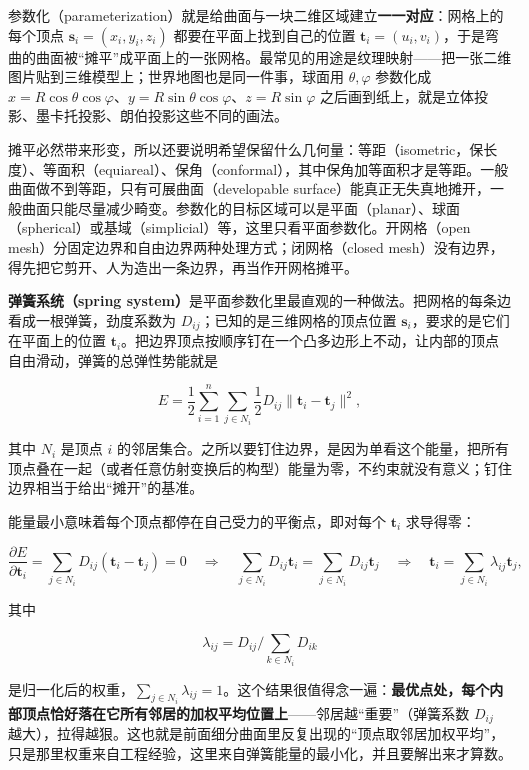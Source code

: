 参数化（parameterization）就是给曲面与一块二维区域建立\textbf{一一对应}：网格上的每个顶点 $\mathbf{s}_i = (x_i, y_i, z_i)$ 都要在平面上找到自己的位置 $\mathbf{t}_i = (u_i, v_i)$，于是弯曲的曲面被“摊平”成平面上的一张网格。最常见的用途是纹理映射——把一张二维图片贴到三维模型上；世界地图也是同一件事，球面用 $\theta, \varphi$ 参数化成 $x = R\cos\theta\cos\varphi$、$y = R\sin\theta\cos\varphi$、$z = R\sin\varphi$ 之后画到纸上，就是立体投影、墨卡托投影、朗伯投影这些不同的画法。

摊平必然带来形变，所以还要说明希望保留什么几何量：等距（isometric，保长度）、等面积（equiareal）、保角（conformal），其中保角加等面积才是等距。一般曲面做不到等距，只有可展曲面（developable surface）能真正无失真地摊开，一般曲面只能尽量减少畸变。参数化的目标区域可以是平面（planar）、球面（spherical）或基域（simplicial）等，这里只看平面参数化。开网格（open mesh）分固定边界和自由边界两种处理方式；闭网格（closed mesh）没有边界，得先把它剪开、人为造出一条边界，再当作开网格摊平。

\textbf{弹簧系统（spring system）}是平面参数化里最直观的一种做法。把网格的每条边看成一根弹簧，劲度系数为 $D_{ij}$；已知的是三维网格的顶点位置 $\mathbf{s}_i$，要求的是它们在平面上的位置 $\mathbf{t}_i$。把边界顶点按顺序钉在一个凸多边形上不动，让内部的顶点自由滑动，弹簧的总弹性势能就是

\[
E = \frac{1}{2}\sum_{i=1}^{n}\sum_{j\in N_i}\frac{1}{2}D_{ij}\|\mathbf{t}_i - \mathbf{t}_j\|^2,
\]

其中 $N_i$ 是顶点 $i$ 的邻居集合。之所以要钉住边界，是因为单看这个能量，把所有顶点叠在一起（或者任意仿射变换后的构型）能量为零，不约束就没有意义；钉住边界相当于给出“摊开”的基准。

能量最小意味着每个顶点都停在自己受力的平衡点，即对每个 $\mathbf{t}_i$ 求导得零：

\[
\frac{\partial E}{\partial \mathbf{t}_i} = \sum_{j\in N_i}D_{ij}(\mathbf{t}_i - \mathbf{t}_j) = 0
\quad\Longrightarrow\quad
\sum_{j\in N_i}D_{ij}\mathbf{t}_i = \sum_{j\in N_i}D_{ij}\mathbf{t}_j
\quad\Longrightarrow\quad
\mathbf{t}_i = \sum_{j\in N_i}\lambda_{ij}\mathbf{t}_j,
\]

其中

\[
\lambda_{ij} = D_{ij}\Big/\sum_{k\in N_i}D_{ik}
\]

是归一化后的权重，$\sum_{j\in N_i}\lambda_{ij} = 1$。这个结果很值得念一遍：\textbf{最优点处，每个内部顶点恰好落在它所有邻居的加权平均位置上}——邻居越“重要”（弹簧系数 $D_{ij}$ 越大），拉得越狠。这也就是前面细分曲面里反复出现的“顶点取邻居加权平均”，只是那里权重来自工程经验，这里来自弹簧能量的最小化，并且要解出来才算数。

